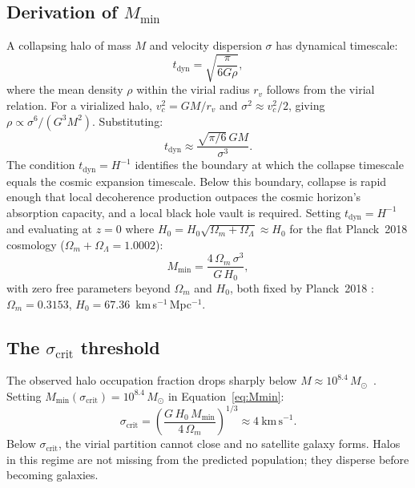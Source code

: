 \documentclass[12pt,a4paper]{article}
\begin{document}
\subsection{Derivation of $M_\mathrm{min}$}

A collapsing halo of mass $M$ and velocity dispersion $\sigma$ has dynamical
timescale:
\begin{equation}
t_\mathrm{dyn} = \sqrt{\frac{\pi}{6G\rho}},
\label{eq:tdyn}
\end{equation}
where the mean density $\rho$ within the virial radius $r_v$ follows from the
virial relation. For a virialized halo, $v_c^2 = GM/r_v$ and
$\sigma^2 \approx v_c^2/2$, giving $\rho \propto \sigma^6/(G^3 M^2)$.
Substituting:
\begin{equation}
t_\mathrm{dyn} \approx \frac{\sqrt{\pi/6}\,GM}{\sigma^3}.
\label{eq:tdyn2}
\end{equation}
The condition $t_\mathrm{dyn} = H^{-1}$ identifies the boundary at which the
collapse timescale equals the cosmic expansion timescale. Below this boundary,
collapse is rapid enough that local decoherence production outpaces the cosmic
horizon's absorption capacity, and a local black hole vault is required. Setting
$t_\mathrm{dyn} = H^{-1}$ and evaluating at $z = 0$ where
$H_0 = H_0\sqrt{\Omega_m + \Omega_\Lambda} \approx H_0$ for the flat
Planck~2018 cosmology ($\Omega_m + \Omega_\Lambda = 1.0002$):
\begin{equation}
\boxed{M_\mathrm{min} = \frac{4\,\Omega_m\,\sigma^3}{G\,H_0}},
\label{eq:Mmin}
\end{equation}
with zero free parameters beyond $\Omega_m$ and $H_0$, both fixed by
Planck~2018 \citep{PlanckVI2020}: $\Omega_m = 0.3153$,
$H_0 = 67.36$~km\,s$^{-1}$\,Mpc$^{-1}$.

\subsection{The $\sigma_\mathrm{crit}$ threshold}

The observed halo occupation fraction drops sharply below
$M \approx 10^{8.4}\,M_\odot$~\citep{Kim2021}. Setting
$M_\mathrm{min}({\sigma_\mathrm{crit}}) = 10^{8.4}\,M_\odot$ in
Equation~\ref{eq:Mmin}:
\begin{equation}
\sigma_\mathrm{crit}
= \left(\frac{G\,H_0\,M_\mathrm{min}}{4\,\Omega_m}\right)^{1/3}
\approx 4\ \mathrm{km\,s}^{-1}.
\label{eq:sigma_crit}
\end{equation}
Below $\sigma_\mathrm{crit}$, the virial partition cannot close and no
satellite galaxy forms. Halos in this regime are not missing from the
predicted population; they disperse before becoming galaxies.
\end{document}
